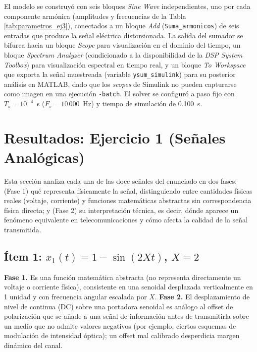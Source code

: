 \documentclass[conference]{IEEEtran}
\begin{document}
El modelo se construyó con seis bloques \textit{Sine Wave} independientes, uno por cada componente armónica (amplitudes y frecuencias de la Tabla \ref{tab:parametros_ej3}), conectados a un bloque \textit{Add} (\texttt{Suma\_armonicos}) de seis entradas que produce la señal eléctrica distorsionada. La salida del sumador se bifurca hacia un bloque \textit{Scope} para visualización en el dominio del tiempo, un bloque \textit{Spectrum Analyzer} (condicionado a la disponibilidad de la \textit{DSP System Toolbox}) para visualización espectral en tiempo real, y un bloque \textit{To Workspace} que exporta la señal muestreada (variable \texttt{ysum\_simulink}) para su posterior análisis en MATLAB, dado que los \textit{scopes} de Simulink no pueden capturarse como imagen en una ejecución \texttt{-batch}. El solver se configuró a paso fijo con $T_s = 10^{-4}$~s ($F_s=10\,000$~Hz) y tiempo de simulación de 0.100~s.

\section{Resultados: Ejercicio 1 (Señales Analógicas)}

Esta sección analiza cada una de las doce señales del enunciado en dos fases: (Fase 1) qué representa físicamente la señal, distinguiendo entre cantidades físicas reales (voltaje, corriente) y funciones matemáticas abstractas sin correspondencia física directa; y (Fase 2) su interpretación técnica, es decir, dónde aparece un fenómeno equivalente en telecomunicaciones y cómo afecta la calidad de la señal transmitida.

\subsection{Ítem 1: $x_1(t) = 1-\sin(2Xt)$, $X=2$}
\textbf{Fase 1.} Es una función matemática abstracta (no representa directamente un voltaje o corriente física), consistente en una senoidal desplazada verticalmente en 1 unidad y con frecuencia angular escalada por $X$. \textbf{Fase 2.} El desplazamiento de nivel de continua (DC) sobre una portadora senoidal es análogo al offset de polarización que se añade a una señal de información antes de transmitirla sobre un medio que no admite valores negativos (por ejemplo, ciertos esquemas de modulación de intensidad óptica); un offset mal calibrado desperdicia margen dinámico del canal.
\end{document}
